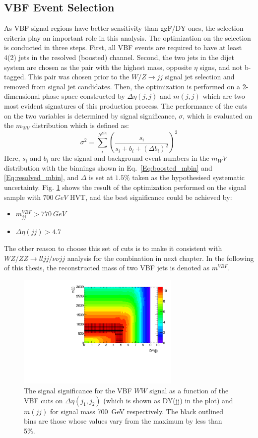 \subsection{VBF Event Selection}
As VBF signal regions have better sensitivity than ggF/DY ones, the selection criteria play an important role in this analysis. The optimization on the selection is conducted in three steps. First, all VBF events are required to have at least 4(2) jets in the resolved (boosted) channel. Second, the two jets in the dijet system are chosen as the pair with the highest mass, opposite $\eta$ signs, and not b-tagged. This pair was chosen prior to the $W/Z\rightarrow jj$ signal jet selection and removed from signal jet candidates. Then, the optimization is performed on a 2-dimensional phase space constructed by $\Delta\eta(j,j)$ and $m(j,j)$ which are two most evident signatures of this production process. The performance of the cuts on the two variables is determined by signal significance, $\sigma$, which is evaluated on the $m_{WV}$ distribution which is defined as:
\begin{equation}
\sigma^2=\displaystyle\sum^{N^{bin}}_i\left(\frac{s_i}{s_i+b_i+({\Delta b_i})^2}\right)^2
\end{equation}
Here, $s_i$ and $b_i$ are the signal and background event numbers in the $m_WV$ distribution with the binnings shown in Eq.~\ref{Eq:boosted_mbin} and \ref{Eq:resolved_mbin}, and $\Delta$ is set at $1.5\%$ taken as the hypothesised systematic uncertainty. Fig. \ref{Fig:VBFOptimization} shows the result of the optimization performed on the signal sample with $700~GeV$ HVT, and the best significance could be achieved by:
\begin{itemize}
	\item {\bf $m_{jj}^{VBF}> 770~GeV$}
	\item {\bf $\Delta\eta(jj)>4.7$}
\end{itemize}
The other reason to choose this set of cuts is to make it consistent with $WZ/ZZ \rightarrow lljj/\nu\nu jj$ analysis\cite{EXOT-2016-29} for the combination in next chapter. In the following of this thesis, the reconstructed mass of two VBF jets is denoted as $m^{VBF}$. 
\begin{figure}[h]
	\centering
	\includegraphics[width=0.7\textwidth]{Chapter3/VBF700_SignfSpace}
	\caption{The signal significance for the VBF $WW$ signal as a function of the VBF cuts on $\Delta \eta(j_1,j_2)$ (which is shown as DY(jj) in the plot) and $m(jj)$ for signal mass 700~GeV respectively. The black outlined bins are those whose values vary from the maximum by less than 5\%.}
	\label{Fig:VBFOptimization}
\end{figure}

